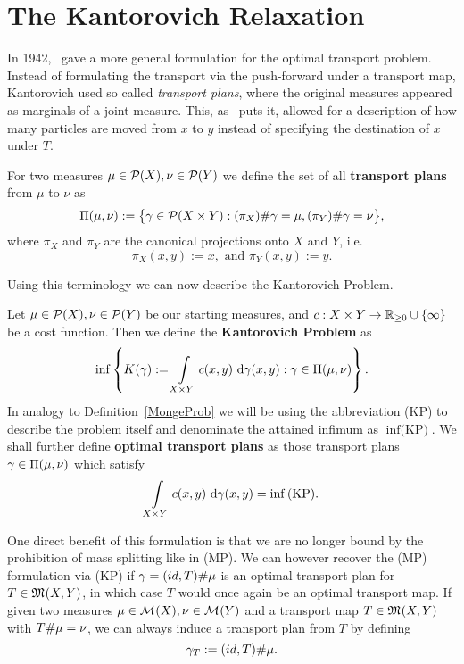 \section{The Kantorovich Relaxation}\label{KantRelax}
In 1942,\ \cite{Kan1942} gave a more general formulation for the optimal transport problem. Instead of formulating the transport via the push-forward under a transport map, Kantorovich used so called \textit{transport plans}, where the original measures appeared as marginals of a joint measure. This, as~\cite{San2015} puts it,  allowed for a description of how many particles are moved from $x$ to $y$ instead of specifying the destination of $x$ under $T$.

\begin{definition}\label{TransPlans}
	For two measures $\mu \in \PM{X}, \nu \in \PM{Y}$ we define the set of all \textbf{transport plans} from $\mu$ to $\nu$ as
	\[ \TP{\mu}{\nu} := \big\{ \gamma \in \PM{X \times Y} : \push[(\pi_X)]{\gamma} = \mu, \push[(\pi_Y)]{\gamma} = \nu \big\}, \]
	where $\pi_X$ and $\pi_Y$ are the canonical projections onto $X$ and $Y$, i.e.
	\[ \pi_X(x, y) := x, \text{ and } \pi_Y(x, y) := y. \]
\end{definition}

Using this terminology we can now describe the Kantorovich Problem.

\begin{definition}\label{KanProb}
	Let $\mu \in \PM{X}, \nu \in \PM{Y}$ be our starting measures, and $\map[c]{X \times Y}{\RZero \cup \{\infty\}}$ be a cost function. Then we define the \textbf{Kantorovich Problem} as
	\begin{equation}\label{KP}
		\inf \left\{ K(\gamma) := \int\limits_{X \times Y} c(x, y)~\Dx[x, y]{\gamma} : \gamma \in \TP{\mu}{\nu} \right\}.
	\end{equation}
	In analogy to Definition~\ref{MongeProb} we will be using the abbreviation (KP) to describe the problem itself and denominate the attained infimum as $\inf \text{(KP)}$. We shall further define \textbf{optimal transport plans} as those transport plans $\gamma \in \TP{\mu}{\nu}$ which satisfy
	\[ \int\limits_{X \times Y} c(x, y)~\Dx[x, y]{\gamma} = \inf \text{(KP)}. \]
\end{definition}

One direct benefit of this formulation is that we are no longer bound by the prohibition of mass splitting like in (MP). We can however recover the (MP) formulation via (KP) if $\gamma = \push[(id, T)]{\mu}$ is an optimal transport plan for $T \in \MF{X}{Y}$, in which case $T$ would once again be an optimal transport map. If given two measures $\mu \in \M{X}, \nu \in \M{Y}$ and a transport map $T \in \MF{X}{Y}$ with $\push{\mu} = \nu$, we can always induce a transport plan from $T$ by defining
\begin{equation}\label{IndPlan}
	\gamma_T := \push[(id, T)]{\mu}.
\end{equation}

